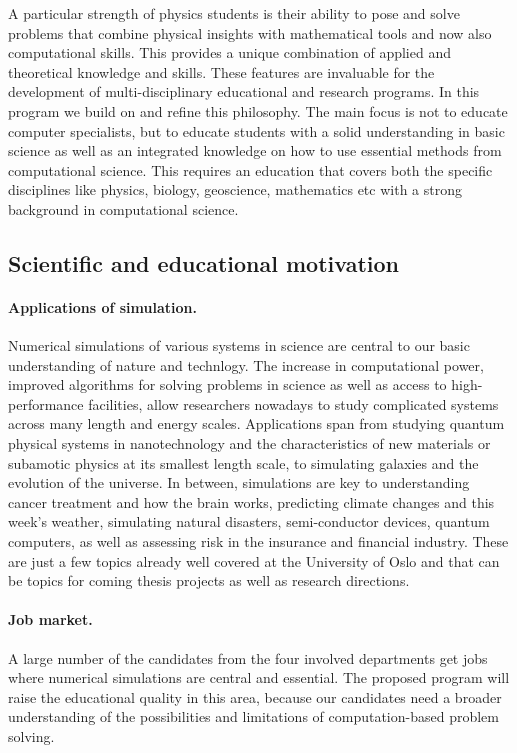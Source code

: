 \documentclass[%
twoside,                 %
final,                   %
10pt]{article}
\begin{document}
A particular strength of physics students is their ability to pose and
solve problems that combine physical insights with mathematical tools
and now also computational skills. This provides a unique combination
of applied and theoretical knowledge and skills. These features are invaluable 
for the development of multi-disciplinary educational and research programs. 
In this program we build on and
refine this philosophy.  The main focus is not to educate computer
specialists, but to educate students with a solid understanding in basic science
as well as an integrated knowledge on how  to use 
essential methods from computational science. This requires an
education that covers both the specific disciplines like physics, biology,
geoscience, mathematics etc with a strong background in computational science.

\subsection*{Scientific and educational motivation}


\paragraph{Applications of simulation.}
Numerical simulations of various systems in science are central to our
basic understanding of nature and technlogy.
The increase in computational power,
improved algorithms for solving problems in science as well as access
to high-performance facilities, allow researchers nowadays to study
complicated systems across many length and energy scales. Applications
span from studying quantum physical systems in nanotechnology and the
characteristics of new materials or subamotic physics at its smallest
length scale, to simulating galaxies and the evolution of the universe.
In between, simulations are key to understanding
cancer treatment and how the brain works,
predicting climate changes and this week's weather,
simulating natural disasters, semi-conductor devices,
quantum computers, as well as assessing risk in the insurance and
financial industry. These are just a few topics
already well covered at the University of Oslo and that can be
topics for coming thesis projects as well as research directions.




\paragraph{Job market.}
A large number of the candidates from the four involved departments
get jobs where numerical simulations are central and essential. The proposed
program will raise the educational quality in this area, because
our candidates need a broader understanding of the possibilities
and limitations of computation-based problem solving.
\end{document}
